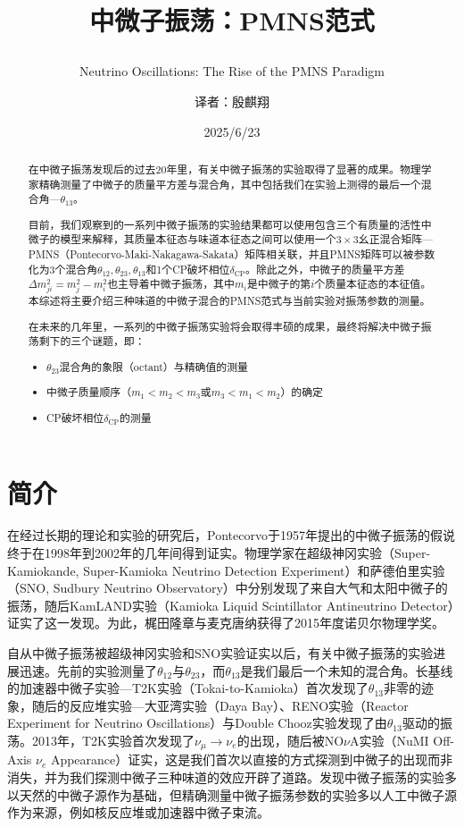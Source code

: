\documentclass{article}
\title{中微子振荡：PMNS范式\\ \subtitle{Neutrino Oscillations: The Rise of the PMNS Paradigm}}
\author{译者：殷麒翔}
\date{2025/6/23}
\begin{document}
	\maketitle
	\begin{abstract}
		在中微子振荡发现后的过去20年里，有关中微子振荡的实验取得了显著的成果。物理学家精确测量了中微子的质量平方差与混合角，其中包括我们在实验上测得的最后一个混合角—$\theta_{13}$。
		
		目前，我们观察到的一系列中微子振荡的实验结果都可以使用包含三个有质量的活性中微子的模型来解释，其质量本征态与味道本征态之间可以使用一个$3\times3$幺正混合矩阵—PMNS（Pontecorvo-Maki-Nakagawa-Sakata）矩阵相关联，并且PMNS矩阵可以被参数化为3个混合角$\theta_{12},\theta_{23},\theta_{13}$和1个CP破坏相位$\delta_\mathrm{CP}$。除此之外，中微子的质量平方差$\Delta m_{ji}^2=m_j^2-m_i^2$也主导着中微子振荡，其中$m_i$是中微子的第$i$个质量本征态的本征值。本综述将主要介绍三种味道的中微子混合的PMNS范式与当前实验对振荡参数的测量。
		
		在未来的几年里，一系列的中微子振荡实验将会取得丰硕的成果，最终将解决中微子振荡剩下的三个谜题，即：
		\begin{itemize}
			\item $\theta_{23}$混合角的象限（octant）与精确值的测量
			\item 中微子质量顺序（$m_1<m_2<m_3$或$m_3<m_1<m_2$）的确定
			\item CP破坏相位$\delta_\mathrm{CP}$的测量
		\end{itemize}
	\end{abstract}
	\section{简介}
	在经过长期的理论和实验的研究后，Pontecorvo于1957年\cite{Pontecorvo1957}\cite{Pontecorvo1958b}提出的中微子振荡的假说终于在1998年到2002年的几年间得到证实。物理学家在超级神冈实验（Super-Kamiokande, Super-Kamioka
Neutrino Detection Experiment）\cite{Fukuda1998}和萨德伯里实验（SNO, Sudbury Neutrino Observatory）\cite{Ahmad2002}中分别发现了来自大气和太阳中微子的振荡，随后KamLAND实验（Kamioka Liquid Scintillator Antineutrino Detector）\cite{Eguchi2003}证实了这一发现。为此，梶田隆章与麦克唐纳获得了2015年度诺贝尔物理学奖。

	自从中微子振荡被超级神冈实验和SNO实验证实以后，有关中微子振荡的实验进展迅速。先前的实验测量了$\theta_{12}$与$\theta_{23}$，而$\theta_{13}$是我们最后一个未知的混合角。长基线的加速器中微子实验—T2K实验（Tokai-to-Kamioka）\cite{Abe2011}首次发现了$\theta_{13}$非零的迹象，随后的反应堆实验—大亚湾实验（Daya Bay）\cite{An2012}、RENO实验（Reactor Experiment for Neutrino Oscillations）\cite{Ahn2012}与Double Chooz实验\cite{Abe2012D}发现了由$\theta_{13}$驱动的振荡。2013年，T2K实验首次发现了$\nu_\mu\to\nu_e$的出现\cite{Abe2014}，随后被NO$\nu$A实验（NuMI Off-Axis $\nu_e$ Appearance）证实\cite{Adamson2017}，这是我们首次以直接的方式探测到中微子的出现而非消失，并为我们探测中微子三种味道的效应开辟了道路。发现中微子振荡的实验多以天然的中微子源作为基础，但精确测量中微子振荡参数的实验多以人工中微子源作为来源，例如核反应堆或加速器中微子束流。
	
\end{document}
